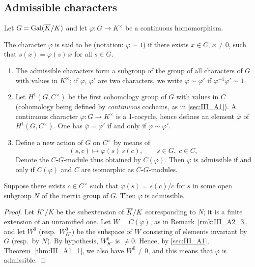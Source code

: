 \begin{subappendices}
\subsection{Admissible characters}
\label{sec:III_A2}
Let $G = \operatorname{Gal}(\overline{K}/K)$ and let $\varphi\colon G \to K^\times$ be a
continuous homomorphism.
\begin{mydef}
	The character $\varphi$ is said to be %
	 (notation: $\varphi \sim 1$) if there
	exists $x \in C$, $x \ne 0$, such that $s(x) = \varphi(s)\, x$ for all
	$s \in G$.
\end{mydef}

\begin{obs}
\begin{enumerate}
\item The admissible characters form a subgroup of the group of all characters
	of $G$ with values in $K^\times$; if $\varphi$, $\varphi'$ are two
	characters, we write $\varphi \sim \varphi'$ if $\varphi^{-1} \varphi'
	\sim 1$.
\item Let $H^1(G, C^\times)$ be the first cohomology group of $G$ with values
	in $C$ (cohomology being defined by \emph{continuous} cochains, as in
	\ref{sec:III_A1}). A continuous character $\varphi \colon G \to
	K^\times$ is a 1-cocycle, hence defines an element $\overline{\varphi}$
	of $H^1(G, C^\times)$. One has $\overline{\varphi} =
	\overline{\varphi'}$ if and only if $\varphi \sim \varphi'$.

\item\label{rmk:III_A2_3}
	Define a new action of $G$ on $C^\times$ by means of
	\dpage
	\[
		(s, c) \longmapsto \varphi(s)\, s(c),
		\qquad s\in G,\; c \in C,
	\]
	Denote the $C$-$G$-module thus obtained by $C(\varphi)$. Then $\varphi$
	is admissible if and only if $C(\varphi)$ and $C$ are isomorphic as
	$C$-$G$-modules.
\end{enumerate}
\end{obs}

\begin{prop}
	Suppose there exists $c \in C^\times$ such that $\varphi(s) = s(c)/c$
	for $s$ in some open subgroup $N$ of the inertia group of $G$. Then
	$\varphi$ is admissible.
\end{prop}
\begin{proof}
	Let $K'/K$ be the subextension of $\overline{K}/K$ corresponding to $N$; it
	is a finite extension of an unramified one. Let $W = C(\varphi)$, as in
	Remark~\ref{rmk:III_A2_3}, and let $W^0$ (resp.\ $W^0_{K'}$) be the
	subspace of $W$ consisting of elements invariant by $G$ (resp.\ by
	$N$). By hypothesis, $W_{K'}^0$ is $\ne 0$. Hence, by \ref{sec:III_A1},
	Theorem~\ref{thm:III_A1_1}, we also have $W^0 \ne 0$,
	and this means that $\varphi$ is admissible.
\end{proof}


\end{subappendices}
